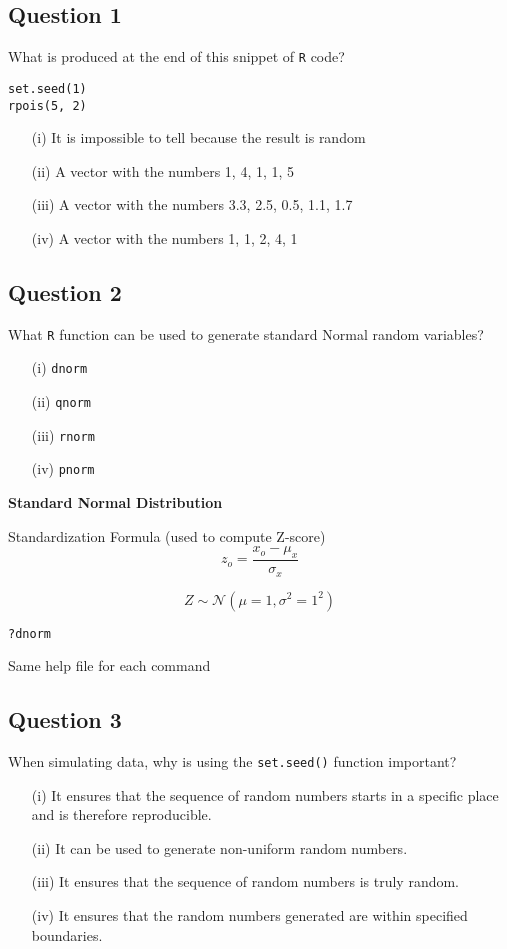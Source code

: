 \documentclass[11pt]{article} %
\begin{document}
\subsection*{Question 1}
What is produced at the end of this snippet of \texttt{R} code?
\begin{framed}
\begin{verbatim}
set.seed(1)
rpois(5, 2)
\end{verbatim}
\end{framed}
\begin{itemize}
\item[(i)] It is impossible to tell because the result is random
\item[(ii)] A vector with the numbers 1, 4, 1, 1, 5
\item[(iii)] A vector with the numbers 3.3, 2.5, 0.5, 1.1, 1.7
\item[(iv)] A vector with the numbers 1, 1, 2, 4, 1
\end{itemize}
\newpage
\subsection*{Question 2}
What \texttt{R} function can be used to generate standard Normal random variables?

\begin{itemize}
\item[(i)] \texttt{dnorm}
\item[(ii)] \texttt{qnorm}
\item[(iii)] \texttt{rnorm}
\item[(iv)] \texttt{pnorm}
\end{itemize}

\noindent \textbf{Standard Normal Distribution}

Standardization Formula (used to compute Z-score)
\[ z_o = \frac{x_o - \mu_x}{\sigma_x} \]

\[  Z \sim \mathcal{N}(\mu=1,\sigma^2=1^2)\]

\begin{framed}
\begin{verbatim}
?dnorm
\end{verbatim}
\end{framed}
Same help file for each command
\newpage
\subsection*{Question 3}
When simulating data, why is using the \texttt{set.seed()} function important?
\begin{itemize}
\item[(i)] It ensures that the sequence of random numbers starts in a specific place and is therefore reproducible.
\item[(ii)] It can be used to generate non-uniform random numbers.
\item[(iii)] It ensures that the sequence of random numbers is truly random.
\item[(iv)] It ensures that the random numbers generated are within specified boundaries.
\end{itemize}
\end{document}
